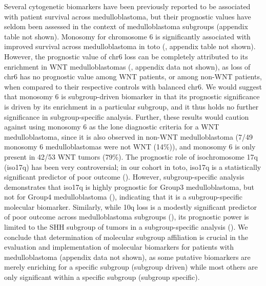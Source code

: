 Several cytogenetic biomarkers have been previously reported to be associated with patient survival across medulloblastoma, but their prognostic values have seldom been assessed in the context of medulloblastoma subgroups (appendix table not shown). Monosomy for chromosome 6 is significantly associated with improved survival across medulloblastoma in toto (, appendix table not shown). However, the prognostic value of chr6 loss can be completely attributed to its enrichment in WNT medulloblastomas (, appendix data not shown), as loss of chr6 has no prognostic value among WNT patients, or among non-WNT patients, when compared to their respective controls with balanced chr6.  We would suggest that monosomy 6 is subgroup-driven biomarker in that its prognostic significance is driven by its enrichment in a particular subgroup, and it thus holds no further significance in subgroup-specific analysis.  Further, these results would caution against using monosomy 6 as the lone diagnostic criteria for a WNT medulloblastoma, since it is also observed in non-WNT medulloblastoma (7/49 monosomy 6 medulloblastomas were not WNT (14\%)), and monosomy 6 is only present in 42/53 WNT tumors (79\%).  The prognostic role of isochromosome 17q (iso17q) has been very controversial; in our cohort in toto, iso17q is a statistically significant predictor of poor outcome ().  However, subgroup-specific analysis demonstrates that iso17q is highly prognostic for Group3 medulloblastoma, but not for Group4 medulloblastoma (), indicating that it is a subgroup-specific molecular biomarker.  Similarly, while 10q loss is a modestly significant predictor of poor outcome across medulloblastoma subgroups (), its prognostic power is limited to the SHH subgroup of tumors in a subgroup-specific analysis ().  We conclude that determination of molecular subgroup affiliation is crucial in the evaluation and implementation of molecular biomarkers for patients with medulloblastoma (appendix data not shown), as some putative biomarkers are merely enriching for a specific subgroup (subgroup driven) while most others are only significant within a specific subgroup (subgroup specific).

\clearpage

